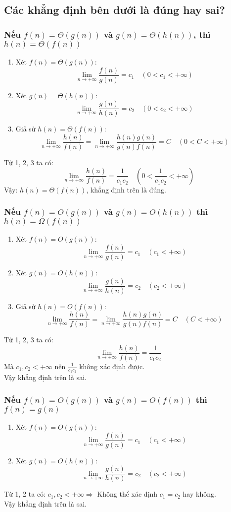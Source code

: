 \subsection{Các khẳng định bên dưới là đúng hay sai?}
\subsubsection{Nếu $f(n) = \Theta(g(n))$ và $g(n) = \Theta(h(n))$, thì $h(n) = \Theta(f(n))$}
\begin{enumerate}
    \item Xét $f(n) = \Theta(g(n))$:
    $$\lim_{n \to +\infty} \frac{f(n)}{g(n)} = c_1 \quad (0 < c_1 < +\infty)$$
    \item Xét $g(n) = \Theta(h(n))$:
    $$\lim_{n \to +\infty} \frac{g(n)}{h(n)} = c_2 \quad (0 < c_2< +\infty)$$ 
    \item Giả sử $h(n) = \Theta(f(n))$:
        $$\lim_{n \to +\infty} \frac{h(n)}{f(n)} = \lim_{n \to +\infty} \frac{h(n)g(n)}{g(n)f(n)} = C\quad (0<C<+\infty)$$
\end{enumerate}
Từ 1, 2, 3 ta có: $$\lim_{n \to +\infty} \frac{h(n)}{f(n)} = \frac{1}{c_1 c_2} \quad (0 < \frac{1}{c_1 c_2} < +\infty)$$
Vậy: $h(n) = \Theta(f(n))$, khẳng định trên là đúng.
\subsubsection{Nếu $f(n) = O(g(n))$ và $g(n) = O(h(n))$ thì $h(n) = \Omega(f(n))$}
\begin{enumerate}
    \item Xét $f(n) = O(g(n))$:
    $$\lim_{n \to +\infty} \frac{f(n)}{g(n)} = c_1 \quad (c_1 < +\infty)$$
    \item Xét $g(n) = O(h(n))$:
    $$\lim_{n \to +\infty} \frac{g(n)}{h(n)} = c_2 \quad (c_2< +\infty)$$ 
    \item Giả sử $h(n) = O(f(n))$:
        $$\lim_{n \to +\infty} \frac{h(n)}{f(n)} = \lim_{n \to +\infty} \frac{h(n)g(n)}{g(n)f(n)} = C\quad (C<+\infty)$$
\end{enumerate}
Từ 1, 2, 3 ta có: $$\lim_{n \to +\infty} \frac{h(n)}{f(n)} = \frac{1}{c_1 c_2}$$
Mà $c_1, c_2 < +\infty$ nên $\frac{1}{c_1 c_2}$ không xác định được.\\
Vậy khẳng định trên là sai.
\subsubsection{Nếu $f(n) = O(g(n))$ và $g(n) = O(f(n))$ thì $f(n) = g(n)$}
\begin{enumerate}
    \item Xét $f(n) = O(g(n))$:
    $$\lim_{n \to +\infty} \frac{f(n)}{g(n)} = c_1 \quad (c_1 < +\infty)$$
    \item Xét $g(n) = O(h(n))$:
    $$\lim_{n \to +\infty} \frac{g(n)}{h(n)} = c_2 \quad (c_2< +\infty)$$ 
\end{enumerate}
Từ 1, 2 ta có: $c_1, c_2 < +\infty \Rightarrow$ Không thể xác định $c_1 = c_2$ hay không.\\
Vậy khẳng định trên là sai.
